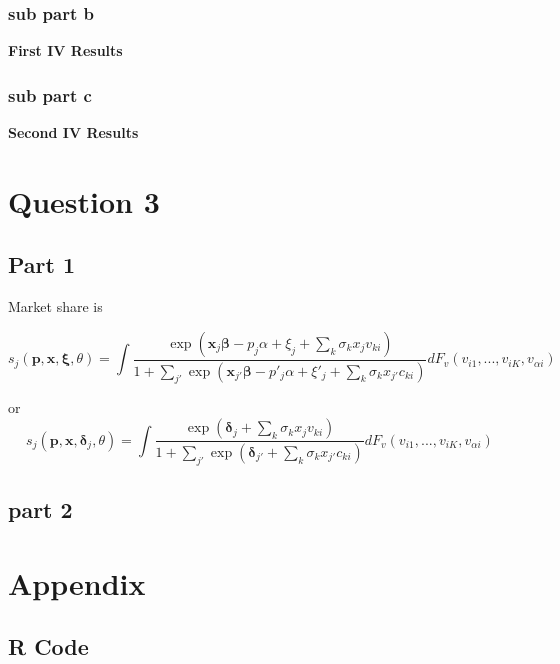 \documentclass[11pt]{article}
\begin{document}
\subsubsection{sub part b}

\begin{center}
	\centering
	\textbf{First IV Results}\par\medskip
	\scalebox{1}{
		
	}
\end{center}


\subsubsection{sub part c}
\begin{center}
	\centering
	\textbf{Second IV Results}\par\medskip
	\scalebox{1}{
		
	}
\end{center}



\section{Question 3}

\subsection{Part 1}

Market share is 

$$ s_j(\bm p, \bm x, \bm \xi, \theta) = 
\int \frac{\exp (\bm x_{j} \bm \beta - p_j\alpha + \xi_j + \sum_k \sigma_k x_j v_{ki})}
{1 + \sum_{j'} \exp(\bm x_{j'} \bm \beta - p'_j \alpha + \xi'_j + \sum_k \sigma_k x_{j'} c_{ki})}
dF_v(v_{i1}, ..., v_{iK}, v_{\alpha i})
$$

or 
$$ s_j(\bm p, \bm x, \bm \delta_j, \theta) = 
\int \frac{\exp (\bm \delta_j  + \sum_k \sigma_k x_j v_{ki})}
{1 + \sum_{j'} \exp(\bm \delta_{j'} + \sum_k \sigma_k x_{j'} c_{ki})}
dF_v(v_{i1}, ..., v_{iK}, v_{\alpha i})
$$



\subsection{part 2}




\section{Appendix}
\subsection{R Code}





\end{document}
